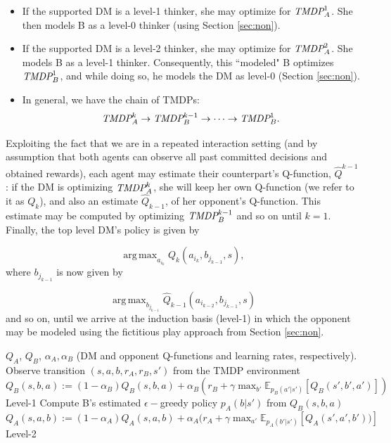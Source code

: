 \documentclass[letterpaper]{article} %
\DeclareMathOperator*{\argmax}{arg\,max}
\begin{document}
\begin{itemize}
\item If the supported DM is a level-1 thinker, she may optimize for $ \emph{TMDP}_{A}^1 $. She then models B as a level-0 thinker (using Section \ref{sec:non}).
\item If the supported DM is a level-2 thinker, she may optimize for $ \emph{TMDP}_{A}^2 $. She models B as a level-1 thinker. Consequently, this ``modeled" B optimizes $ \emph{TMDP}_{B}^1 $, and while doing so, he models the DM as level-0 (Section \ref{sec:non}).
\item In general, we have the chain of TMDPs: $$ \emph{TMDP}_{A}^k \rightarrow \emph{TMDP}_{B}^{k-1} \rightarrow \cdots \rightarrow \emph{TMDP}_{B}^{1}.$$
\end{itemize}
Exploiting the fact that we are in a repeated interaction setting (and by assumption that both agents can observe all past committed decisions and obtained rewards), each agent may  estimate their counterpart's Q-function, $\hat{Q}^{k-1}$: 
if the DM is optimizing $\emph{TMDP}_A^k$, she will keep her own Q-function (we refer to it as $Q_k$), and also an estimate $\hat{Q}_{k-1}$, of her opponent's Q-function. This estimate may be computed by optimizing $\emph{TMDP}_B^{k-1}$ and so on until $k=1$.
Finally, the top level DM's policy is given by

\[
\argmax_{a_{i_k}} Q_k(a_{i_k}, b_{j_{k-1}}, s),
\]
where $b_{j_{k-1}}$ is now given by 

\[
\argmax_{b_{j_{k-1}}} \hat{Q}_{k-1}(a_{i_{k-2}}, b_{j_{k-1}}, s)
\]
and so on, until we arrive at the induction basis (level-1) in which the opponent may be modeled using the fictitious play approach from Section \ref{sec:non}.

\begin{algorithm*}[!ht]
\begin{algorithmic}
\Require $Q_A$, $Q_B$, $\alpha_A, \alpha_B$ (DM and opponent Q-functions and learning rates, respectively).
\State Observe  transition $(s, a, b, r_A, r_B, s')$ from the TMDP environment
\State $Q_B(s,b,a) := (1 - \alpha_B)Q_B(s,b,a)  + \alpha_B (r_B + \gamma \max_{b'} \mathbb{E}_{p_B(a'|s')} \left[ Q_B(s',b', a') \right] )$ \Comment Level-1
\State Compute B's estimated $\epsilon-$greedy policy $p_A(b|s')$ from $Q_B(s,b,a)$
\State $Q_A(s,a,b) := (1 - \alpha_A)Q_A(s,a,b) + \alpha_A (r_A + \gamma \max_{a'} \mathbb{E}_{p_A(b'|s')} \left[ Q_A(s',a',b')) \right] $ \Comment Level-2 
\end{algorithmic}
\caption{Level-2 thinking update rule}
\label{alg:l2ur}
\end{algorithm*}
\end{document}

